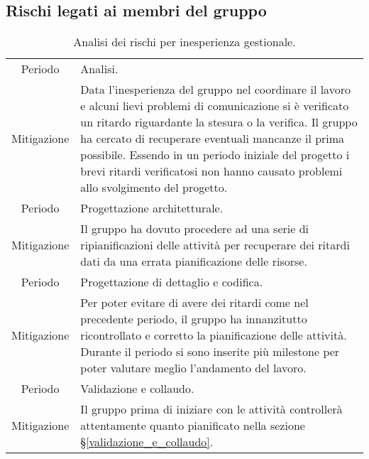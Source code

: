 \subsection{Rischi legati ai membri del gruppo}
\begin{table}[H]
	\centering
    \begin{tabular}{|c|p{11.5cm}|}
    \rowcolor{darkblue} \hline
    \multicolumn{2}{|c|}{\textcolor{white}{\textbf{RG1 - Inesperienza gestionale}}}\\ \hline
    Periodo & Analisi.\\ \hline
    Mitigazione & Data l'inesperienza del gruppo nel coordinare il lavoro e alcuni lievi problemi di comunicazione si è verificato un ritardo riguardante la stesura o la verifica. Il gruppo ha cercato di recuperare eventuali mancanze il prima possibile. Essendo in un periodo iniziale del progetto i brevi ritardi verificatosi non hanno causato problemi allo svolgimento del progetto.\\ \hline
    Periodo & Progettazione architetturale.\\ \hline
    Mitigazione & Il gruppo ha dovuto procedere ad una serie di ripianificazioni delle attività per recuperare dei ritardi dati da una errata pianificazione delle risorse.\\ \hline
    Periodo & Progettazione di dettaglio e codifica.\\ \hline
    Mitigazione & Per poter evitare di avere dei ritardi come nel precedente periodo, il gruppo ha innanzitutto ricontrollato e corretto la pianificazione delle attività. Durante il periodo si sono inserite più milestone per poter valutare meglio l'andamento del lavoro.  \\ \hline
    Periodo & Validazione e collaudo.\\ \hline
    Mitigazione & Il gruppo prima di iniziare con le attività controllerà attentamente quanto pianificato nella sezione \S\ref{validazione_e_collaudo}.\\ \hline
    \end{tabular}
    \caption{\label{tab:ARG3}Analisi dei rischi per inesperienza gestionale.}
\end{table}
